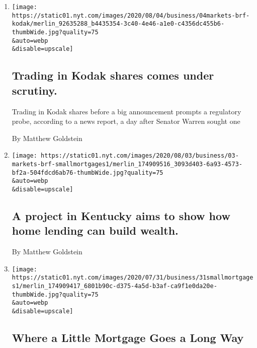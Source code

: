 \begin{enumerate}
\def\labelenumi{\arabic{enumi}.}
\item
  \href{/live/2020/08/04/business/stock-market-today-coronavirus/trading-in-kodak-shares-comes-under-scrutiny}{}

  \texttt{[image: https://static01.nyt.com/images/2020/08/04/business/04markets-brf-kodak/merlin\_92635288\_b4435354-3c40-4e46-a1e0-c4356dc455b6-thumbWide.jpg?quality=75\\\&auto=webp\\\&disable=upscale]}

  \hypertarget{trading-in-kodak-shares-comes-under-scrutiny}{%
  \subsection{Trading in Kodak shares comes under
  scrutiny.}\label{trading-in-kodak-shares-comes-under-scrutiny}}

  Trading in Kodak shares before a big announcement prompts a regulatory
  probe, according to a news report, a day after Senator Warren sought
  one

  By Matthew Goldstein
\item
  \href{/2020/08/03/business/a-project-in-kentucky-aims-to-show-how-home-lending-can-build-wealth.html}{}

  \texttt{[image: https://static01.nyt.com/images/2020/08/03/business/03-markets-brf-smallmortgages1/merlin\_174909516\_3093d403-6a93-4573-bf2a-504fdcd6ab76-thumbWide.jpg?quality=75\\\&auto=webp\\\&disable=upscale]}

  \hypertarget{a-project-in-kentucky-aims-to-show-how-home-lending-can-build-wealth}{%
  \subsection{A project in Kentucky aims to show how home lending can
  build
  wealth.}\label{a-project-in-kentucky-aims-to-show-how-home-lending-can-build-wealth}}

  By Matthew Goldstein
\item
  \href{/2020/08/02/business/mortgages-affordable-housing.html}{}

  \texttt{[image: https://static01.nyt.com/images/2020/07/31/business/31smallmortgages1/merlin\_174909417\_6801b90c-d375-4a5d-b3af-ca9f1e0da20e-thumbWide.jpg?quality=75\\\&auto=webp\\\&disable=upscale]}

  \hypertarget{where-a-little-mortgage-goes-a-long-way}{%
  \subsection{Where a Little Mortgage Goes a Long
  Way}\label{where-a-little-mortgage-goes-a-long-way}}


\end{enumerate}
